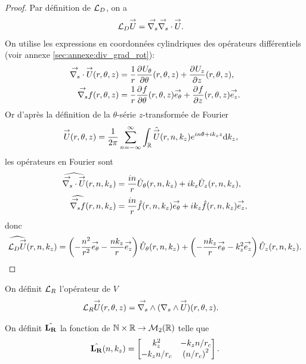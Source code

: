     \begin{proof}
      Par définition de \(\LD\), on a
      \begin{align*}
        \LD \vect{U} & = \vgrads{} \vdivs{} \vect{U}.
      \end{align*}
      On utilise les expressions en coordonnées cylindriques des opérateurs différentiels (voir annexe \ref{sec:annexe:div_grad_rot}):
      \begin{align*}
        \vdivs{\vect{U}}(r,\theta,z) &= \frac{1}{r}\ddr{\theta}{U_\theta}(r,\theta,z) + \ddr{z}{U_z}(r,\theta,z),
        \\
        \vgrads{f}(r,\theta,z) &= \frac{1}{r}\ddr{\theta}{f}(r,\theta,z)\vect{e_\theta} + \ddr{z}{f}(r,\theta,z)\vect{e_z}.
      \end{align*}
      Or d’après la définition de la \(\theta\)-série \(z\)-transformée de Fourier
      \begin{align*}
        \vect{U}(r,\theta,z) & = \frac{1}{2\pi}\sum_{n=-\infty}^\infty \int_\RR \hat{\vect{U}}(r,n,k_z)e^{in\theta + ik_zz}\dd{k_z},
      \end{align*}
      les opérateurs en Fourier sont
      \begin{align*}
        \widehat{\vdivs{\vect{U}}}(r,n,k_z) &= \frac{in}{r}{\hat{U}_\theta}(r,n,k_z) + ik_z{\hat{U}_z}(r,n,k_z),
        \\
        \widehat{\vgrads{f}}(r,n,k_z) &= \frac{in}{r}\hat{f}(r,n,k_z)\vect{e_\theta} + ik_z\hat{f}(r,n,k_z)\vect{e_z},
      \end{align*}
      donc
      \begin{align*}
        \widehat{\LD{\vect{U}}}(r,n,k_z) =  \left(-\frac{n^2}{r^2}\vect{e_\theta} - \frac{nk_z}{r}\vect{e_z}\right){\hat{U}_\theta}(r,n,k_z) + \left(-\frac{nk_z}{r}\vect{e_\theta} - {k_z^2}\vect{e_z}\right){\hat{U}_z}(r,n,k_z).
      \end{align*}

    \end{proof}


    \begin{defn}
      \label{eq:cylindre:fourier:LR}

      On définit \(\LR\) l'opérateur de \(V\)
      \begin{align*}
        \LR \vect{U}(r,\theta,z) & = \vrots{} (\rots{} \vect{U})(r,\theta,z).
      \end{align*}

      On définit \(\hat{\mLR}\) la fonction de \(\NN\times\RR \rightarrow \mathcal{M}_2(\RR)\) telle que
      \begin{equation*}
        \hat{\mLR}(n,k_z) = 
        \begin{bmatrix}
          k_z^2 & -k_z{n}\slash{r_c}
          \\
          -k_z{n}\slash{r_c} & \left({n}\slash{r_c}\right)^2
        \end{bmatrix}.
      \end{equation*}
    \end{defn}

